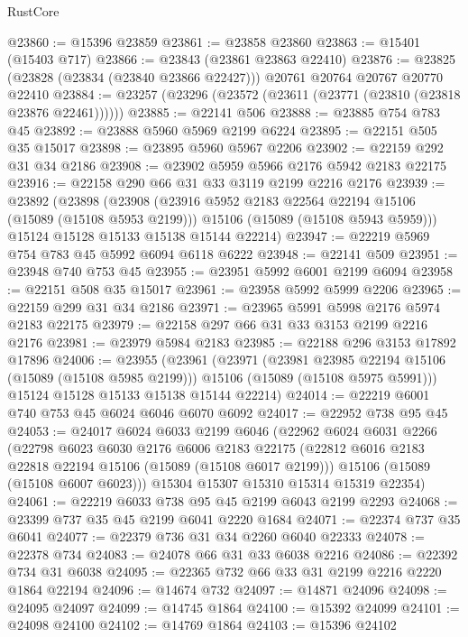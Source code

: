 \begin{lexlean}{RustCore}
\begin{coremodule}
@23860 := @15396 @23859
@23861 := @23858 @23860
@23863 := @15401 (@15403 @717)
@23866 := @23843 (@23861 @23863 @22410)
@23876 := @23825 (@23828 (@23834 (@23840 @23866 @22427))) @20761 @20764 @20767 @20770 @22410
@23884 := @23257 (@23296 (@23572 (@23611 (@23771 (@23810 (@23818 @23876 @22461))))))
@23885 := @22141 @506
@23888 := @23885 @754 @783 @45
@23892 := @23888 @5960 @5969 @2199 @6224
@23895 := @22151 @505 @35 @15017
@23898 := @23895 @5960 @5967 @2206
@23902 := @22159 @292 @31 @34 @2186
@23908 := @23902 @5959 @5966 @2176 @5942 @2183 @22175
@23916 := @22158 @290 @66 @31 @33 @3119 @2199 @2216 @2176
@23939 := @23892
    (@23898
      (@23908
        (@23916 @5952 @2183 @22564 @22194 @15106 (@15089 (@15108 @5953 @2199)))
        @15106
        (@15089 (@15108 @5943 @5959)))
      @15124
      @15128
      @15133
      @15138
      @15144
      @22214)
@23947 := @22219 @5969 @754 @783 @45 @5992 @6094 @6118 @6222
@23948 := @22141 @509
@23951 := @23948 @740 @753 @45
@23955 := @23951 @5992 @6001 @2199 @6094
@23958 := @22151 @508 @35 @15017
@23961 := @23958 @5992 @5999 @2206
@23965 := @22159 @299 @31 @34 @2186
@23971 := @23965 @5991 @5998 @2176 @5974 @2183 @22175
@23979 := @22158 @297 @66 @31 @33 @3153 @2199 @2216 @2176
@23981 := @23979 @5984 @2183
@23985 := @22188 @296 @3153 @17892 @17896
@24006 := @23955
    (@23961
      (@23971
        (@23981 @23985 @22194 @15106 (@15089 (@15108 @5985 @2199)))
        @15106
        (@15089 (@15108 @5975 @5991)))
      @15124
      @15128
      @15133
      @15138
      @15144
      @22214)
@24014 := @22219 @6001 @740 @753 @45 @6024 @6046 @6070 @6092
@24017 := @22952 @738 @95 @45
@24053 := @24017
    @6024
    @6033
    @2199
    @6046
    (@22962
      @6024
      @6031
      @2266
      (@22798
        @6023
        @6030
        @2176
        @6006
        @2183
        @22175
        (@22812 @6016 @2183 @22818 @22194 @15106 (@15089 (@15108 @6017 @2199)))
        @15106
        (@15089 (@15108 @6007 @6023)))
      @15304
      @15307
      @15310
      @15314
      @15319
      @22354)
@24061 := @22219 @6033 @738 @95 @45 @2199 @6043 @2199 @2293
@24068 := @23399 @737 @35 @45 @2199 @6041 @2220 @1684
@24071 := @22374 @737 @35 @6041
@24077 := @22379 @736 @31 @34 @2260 @6040 @22333
@24078 := @22378 @734
@24083 := @24078 @66 @31 @33 @6038 @2216
@24086 := @22392 @734 @31 @6038
@24095 := @22365 @732 @66 @33 @31 @2199 @2216 @2220 @1864 @22194
@24096 := @14674 @732
@24097 := @14871 @24096
@24098 := @24095 @24097
@24099 := @14745 @1864
@24100 := @15392 @24099
@24101 := @24098 @24100
@24102 := @14769 @1864
@24103 := @15396 @24102

\end{coremodule}
\end{lexlean}
